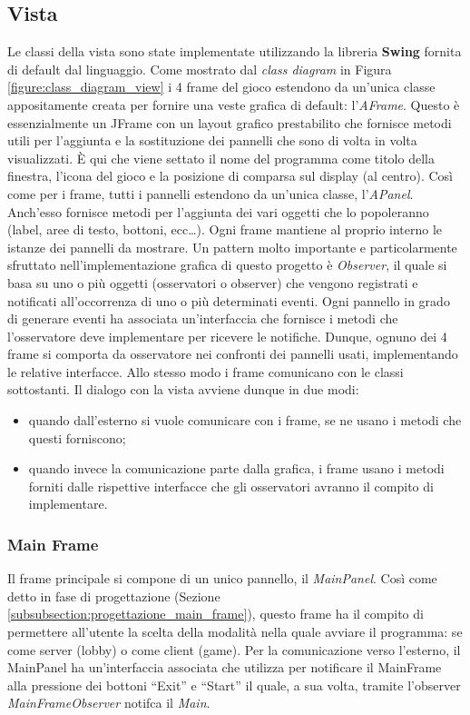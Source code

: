 \subsection{Vista}
Le classi della vista sono state implementate utilizzando la libreria
\textbf{Swing} fornita di default dal linguaggio.\newline
Come mostrato dal \textit{class diagram} in Figura
\ref{figure:class_diagram_view} i 4 frame del gioco estendono da un'unica
classe appositamente creata per fornire una veste grafica di default:
l'\textit{AFrame}. Questo è essenzialmente un JFrame con un layout grafico
prestabilito che fornisce metodi utili per l'aggiunta e la sostituzione dei
pannelli che sono di volta in volta visualizzati. È qui che viene settato il
nome del programma come titolo della finestra, l'icona del gioco e la posizione
di comparsa sul display (al centro).\newline
Così come per i frame, tutti i pannelli estendono da un'unica classe,
l'\textit{APanel}. Anch'esso fornisce metodi per l'aggiunta dei vari oggetti che
lo popoleranno (label, aree di testo, bottoni, ecc\dots). Ogni frame mantiene al
proprio interno le istanze dei pannelli da mostrare.\newline
Un pattern molto importante e particolarmente sfruttato nell'implementazione
grafica di questo progetto è \textit{Observer}, il quale si basa su uno o più
oggetti (osservatori o observer) che vengono registrati e notificati
all'occorrenza di uno o più determinati eventi. Ogni pannello in grado di
generare eventi ha associata un'interfaccia che fornisce i metodi che
l'osservatore deve implementare per ricevere le notifiche. Dunque, ognuno dei 4
frame si comporta da osservatore nei confronti dei pannelli usati, implementando
le relative interfacce. Allo stesso modo i frame comunicano con le classi
sottostanti. Il dialogo con la vista avviene dunque in due modi:
\begin{itemize}
	\item quando dall'esterno si vuole comunicare con i frame, se ne usano i
	metodi che questi forniscono;
	\item quando invece la comunicazione parte dalla grafica, i frame usano i
	metodi forniti dalle rispettive interfacce che gli osservatori avranno il
	compito di implementare.
\end{itemize}



\subsubsection{Main Frame}
Il frame principale si compone di un unico pannello, il \textit{MainPanel}. Così
come detto in fase di progettazione (Sezione
\ref{subsubsection:progettazione_main_frame}), questo frame ha il compito di
permettere all'utente la scelta della modalità nella quale avviare il programma:
se come server (lobby) o come client (game).\newline
Per la comunicazione verso l'esterno, il MainPanel ha un'interfaccia associata
che utilizza per notificare il MainFrame alla pressione dei bottoni ``Exit'' e
``Start'' il quale, a sua volta, tramite l'observer \textit{MainFrameObserver}
notifca il \textit{Main}.



